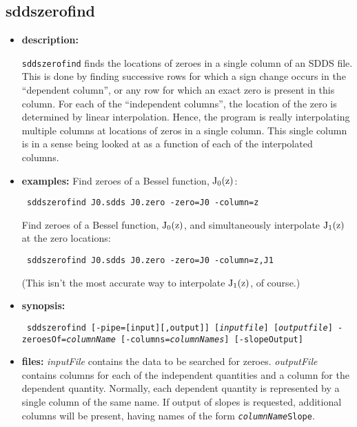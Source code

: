 \begin{latexonly}
\newpage
\end{latexonly}
\subsection{sddszerofind}
\label{sddszerofind}

\begin{itemize}
\item {\bf description:}

{\tt sddszerofind} finds the locations of zeroes in a single column of an SDDS file.  This is done by finding successive rows
for which a sign change occurs in the ``dependent column'', or any row for which an exact zero is present in this column.  For
each of the ``independent columns'', the location of the zero is determined by linear interpolation.  Hence, the program
is really interpolating multiple columns at locations of zeros in a single column.  This single column is in a sense
being looked at as a function of each of the interpolated columns.

\item {\bf examples:} 
Find zeroes of a Bessel function, ${\rm J_0(z)}$:
\begin{flushleft}{\tt
sddszerofind J0.sdds J0.zero -zero=J0 -column=z
}\end{flushleft}
Find zeroes of a Bessel function, ${\rm J_0(z)}$, and simultaneously interpolate ${\rm J_1(z)}$ at
the zero locations:
\begin{flushleft}{\tt
sddszerofind J0.sdds J0.zero -zero=J0 -column=z,J1
}\end{flushleft}
(This isn't the most accurate way to interpolate ${\rm J_1(z)}$, of course.)

\item {\bf synopsis:} 
\begin{flushleft}{\tt
sddszerofind [-pipe=[input][,output]] [{\em inputfile}] [{\em outputfile}] 
-zeroesOf={\em columnName} [-columns={\em columnNames}] [-slopeOutput]
}\end{flushleft}
\item {\bf files:}
{\em inputFile} contains the data to be searched for zeroes.  {\em outputFile} contains columns for each of the independent
quantities and a column for the dependent quantity.  Normally, each dependent quantity is represented by a single column of
the same name.  If output of slopes is requested, additional columns will be present, having names of the form 
{\tt {\em columnName}Slope}.  


\end{itemize}
